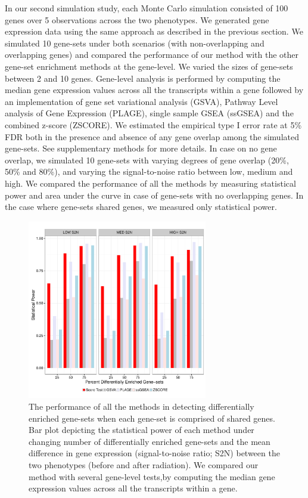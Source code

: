 \documentclass[hidelinks,11pt]{article}
\begin{document}
In our second simulation study, each Monte Carlo simulation consisted of 100 genes over 5 observations across the two phenotypes. We generated gene expression data using the same approach as described in the previous section. We simulated 10 gene-sets under both scenarios (with non-overlapping and overlapping genes) and compared the performance of our method with the other gene-set enrichment methods at the gene-level. We varied the sizes of gene-sets between 2 and 10 genes. Gene-level analysis is performed by computing the median gene expression values across all the transcripts within a gene followed by an implementation of gene set variational analysis (GSVA), Pathway Level analysis of Gene Expression (PLAGE), single sample GSEA (ssGSEA) and the combined z-score (ZSCORE). We estimated the empirical type I error rate at 5\% FDR both in the presence and absence of any gene overlap among the simulated gene-sets. See supplementary methods for more details. In case on no gene overlap, we simulated 10 gene-sets with varying degrees of gene overlap (20\%, 50\% and 80\%), and varying the signal-to-noise ratio between low, medium and high. We compared the performance of all the methods by measuring statistical power and area under the curve in case of gene-sets with no overlapping genes. In the case where gene-sets shared genes, we measured only statistical power. 

\begin{figure}[!ht]
\centering
\includegraphics[width=0.7\textwidth]{Figure3.pdf}
\caption{The performance of all the methods in detecting differentially enriched gene-sets when each gene-set is comprised of shared genes. Bar plot depicting the statistical power of each method under changing number of differentially enriched gene-sets and the mean difference in gene expression (signal-to-noise ratio; S2N) between the two phenotypes (before and after radiation). We compared our method with several gene-level tests,by computing the median gene expression values across all the transcripts within a gene.}
\end{figure}
\end{document}
